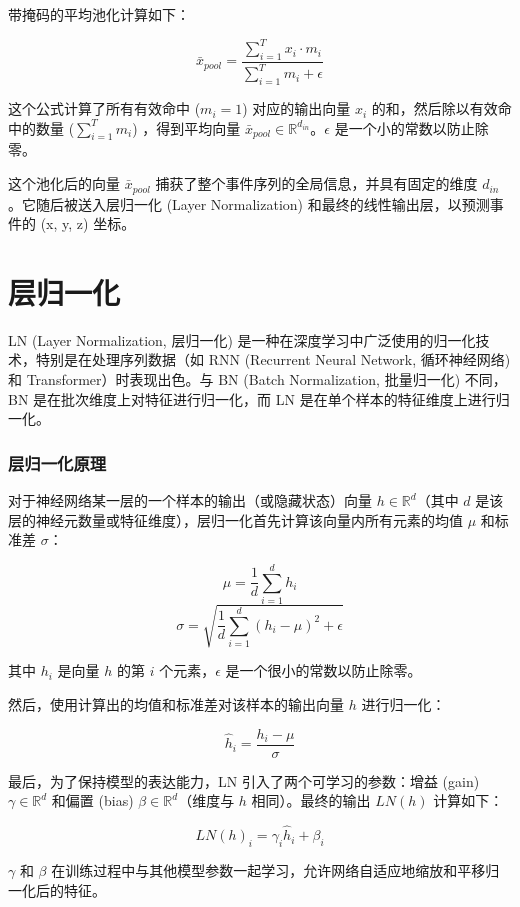 带掩码的平均池化计算如下：

\[ \bar{x}_{pool} = \frac{\sum_{i=1}^{T} x_i \cdot m_i}{\sum_{i=1}^{T} m_i + \epsilon} \]

这个公式计算了所有有效命中 ($m_i=1$) 对应的输出向量 $x_i$ 的和，然后除以有效命中的数量 ($\sum_{i=1}^{T} m_i$) ，得到平均向量 $\bar{x}_{pool} \in \mathbb{R}^{d_{in}}$。$\epsilon$ 是一个小的常数以防止除零。

这个池化后的向量 $\bar{x}_{pool}$ 捕获了整个事件序列的全局信息，并具有固定的维度 $d_{in}$。它随后被送入层归一化 (Layer Normalization) 和最终的线性输出层，以预测事件的 (x, y, z) 坐标。

\chapter{层归一化}

LN (Layer Normalization, 层归一化) 是一种在深度学习中广泛使用的归一化技术，特别是在处理序列数据（如 RNN (Recurrent Neural Network, 循环神经网络) 和 Transformer）时表现出色。与 BN (Batch Normalization, 批量归一化) 不同，BN 是在批次维度上对特征进行归一化，而 LN 是在单个样本的特征维度上进行归一化。

\subsection{层归一化原理}

对于神经网络某一层的一个样本的输出（或隐藏状态）向量 $h \in \mathbb{R}^{d}$（其中 $d$ 是该层的神经元数量或特征维度），层归一化首先计算该向量内所有元素的均值 $\mu$ 和标准差 $\sigma$：

\[ \mu = \frac{1}{d} \sum_{i=1}^{d} h_i \]
\[ \sigma = \sqrt{\frac{1}{d} \sum_{i=1}^{d} (h_i - \mu)^2 + \epsilon} \]

其中 $h_i$ 是向量 $h$ 的第 $i$ 个元素，$\epsilon$ 是一个很小的常数以防止除零。

然后，使用计算出的均值和标准差对该样本的输出向量 $h$ 进行归一化：

\[ \hat{h}_i = \frac{h_i - \mu}{\sigma} \]

最后，为了保持模型的表达能力，LN 引入了两个可学习的参数：增益 (gain) $\gamma \in \mathbb{R}^{d}$ 和偏置 (bias) $\beta \in \mathbb{R}^{d}$（维度与 $h$ 相同）。最终的输出 $LN(h)$ 计算如下：

\[ LN(h)_i = \gamma_i \hat{h}_i + \beta_i \]

$\gamma$ 和 $\beta$ 在训练过程中与其他模型参数一起学习，允许网络自适应地缩放和平移归一化后的特征。

